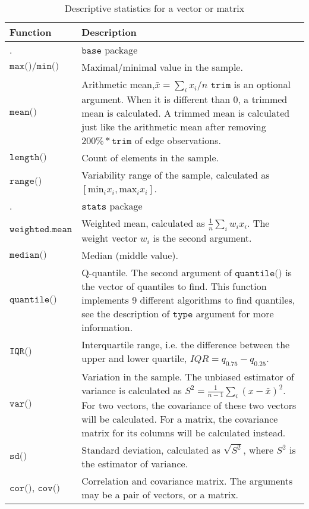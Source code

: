 \documentclass[]{book}
\theoremstyle{definition}
\theoremstyle{definition}
\theoremstyle{definition}
\theoremstyle{remark}
\begin{document}
\begin{table}

\caption{\label{tab:tab01}Descriptive statistics for a vector or matrix}
\centering
\begin{tabular}[t]{>{}l||>{\raggedright\arraybackslash}p{35em}}
\hline
Function & Description\\
\hline
. & $\texttt{base}$ package\\
\hline
$\texttt{max()/min()}$ & Maximal/minimal value in the sample.\\
\hline
$\texttt{mean()}$ & Arithmetic mean,$\bar{x}=\sum_{i}x_i/n$ $\texttt{trim}$ is an optional argument. When it is different than 0, a trimmed mean is calculated. A trimmed mean is calculated just like the arithmetic mean after removing $200\% * \texttt{trim}$ of edge observations.\\
\hline
$\texttt{length()}$ & Count of elements in the sample.\\
\hline
$\texttt{range()}$ & Variability range of the sample, calculated as $[\mbox{min}_i x_i,\mbox{max}_i x_i]$.\\
\hline
. & $\texttt{stats}$ package\\
\hline
$\texttt{weighted.mean}$ & Weighted mean, calculated as $\frac{1}{n}\sum_i w_i x_i$. The weight vector $w_i$ is the second argument.\\
\hline
$\texttt{median()}$ & Median (middle value).\\
\hline
$\texttt{quantile()}$ & Q-quantile. The second argument of $\texttt{quantile()}$ is the vector of quantiles to find. This function implements 9 different algorithms to find quantiles, see the description of $\texttt{type}$ argument for more information.\\
\hline
$\texttt{IQR()}$ & Interquartile range, i.e. the difference between the upper and lower quartile, $IQR=q_{0.75}-q_{0.25}$.\\
\hline
$\texttt{var()}$ & Variation in the sample. The unbiased estimator of variance is calculated as $S^2=\frac{1}{n-1}\sum_i (x-\bar{x})^2$. For two vectors, the covariance of these two vectors will be calculated. For a matrix, the covariance matrix for its columns will be calculated instead.\\
\hline
$\texttt{sd()}$ & Standard deviation, calculated as $\sqrt{S^2}$, where $S^2$ is the estimator of variance.\\
\hline
$\texttt{cor()}$, $\texttt{cov()}$ & Correlation and covariance matrix. The arguments may be a pair of vectors, or a matrix.\\

\end{tabular}
\end{table}
\end{document}

